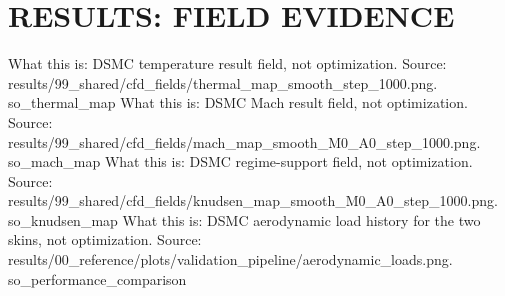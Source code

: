 \documentclass[aspectratio=169,11pt]{beamer}
\begin{document}
\section{RESULTS: FIELD EVIDENCE}
  {%
   What this is: DSMC temperature result field, not optimization.
   Source: results/99\_shared/cfd\_fields/thermal\_map\_smooth\_step\_1000.png.}
  {so_thermal_map}
  {%
   What this is: DSMC Mach result field, not optimization.
   Source: results/99\_shared/cfd\_fields/mach\_map\_smooth\_M0\_A0\_step\_1000.png.}
  {so_mach_map}
  {%
   What this is: DSMC regime-support field, not optimization.
   Source: results/99\_shared/cfd\_fields/knudsen\_map\_smooth\_M0\_A0\_step\_1000.png.}
  {so_knudsen_map}
  {%
   What this is: DSMC aerodynamic load history for the two skins, not optimization.
   Source: results/00\_reference/plots/validation\_pipeline/aerodynamic\_loads.png.}
  {so_performance_comparison}
\end{document}
